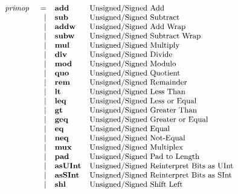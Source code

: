 \documentclass[12pt]{article}
\begin{document}
\[
{\small
\begin{array}{rrll}
\text{\em primop\ }   &=               &\text{\bf add}            &\text{Unsigned/Signed Add}\\
              &\vert           &\text{\bf sub}            &\text{Unsigned/Signed Subtract}\\
              &\vert           &\text{\bf addw}           &\text{Unsigned/Signed Add Wrap}\\
              &\vert           &\text{\bf subw}           &\text{Unsigned/Signed Subtract Wrap}\\
              &\vert           &\text{\bf mul}            &\text{Unsigned/Signed Multiply}\\
              &\vert           &\text{\bf div}            &\text{Unsigned/Signed Divide}\\
              &\vert           &\text{\bf mod}            &\text{Unsigned/Signed Modulo}\\
              &\vert           &\text{\bf quo}            &\text{Unsigned/Signed Quotient}\\
              &\vert           &\text{\bf rem}            &\text{Unsigned/Signed Remainder}\\
              &\vert           &\text{\bf lt}             &\text{Unsigned/Signed Less Than}\\
              &\vert           &\text{\bf leq}            &\text{Unsigned/Signed Less or Equal}\\
              &\vert           &\text{\bf gt}             &\text{Unsigned/Signed Greater Than}\\
              &\vert           &\text{\bf geq}            &\text{Unsigned/Signed Greater or Equal}\\
              &\vert           &\text{\bf eq}             &\text{Unsigned/Signed Equal}\\
              &\vert           &\text{\bf neq}            &\text{Unsigned/Signed Not-Equal}\\
              &\vert           &\text{\bf mux}            &\text{Unsigned/Signed Multiplex}\\
              &\vert           &\text{\bf pad}            &\text{Unsigned/Signed Pad to Length}\\
              &\vert           &\text{\bf asUInt}         &\text{Unsigned/Signed Reinterpret Bits as UInt}\\
              &\vert           &\text{\bf asSInt}         &\text{Unsigned/Signed Reinterpret Bits as SInt}\\
              &\vert           &\text{\bf shl}            &\text{Unsigned/Signed Shift Left}\\

\end{array}}\]
\end{document}
